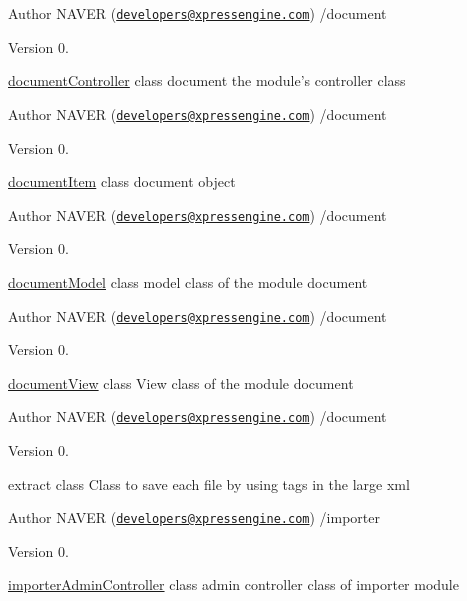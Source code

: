 \begin{DoxyAuthor}{Author}
N\-A\-V\-E\-R (\href{mailto:developers@xpressengine.com}{\tt developers@xpressengine.\-com}) /document 
\end{DoxyAuthor}
\begin{DoxyVersion}{Version}
0.
\end{DoxyVersion}
\hyperlink{classdocumentController}{document\-Controller} class document the module's controller class

\begin{DoxyAuthor}{Author}
N\-A\-V\-E\-R (\href{mailto:developers@xpressengine.com}{\tt developers@xpressengine.\-com}) /document 
\end{DoxyAuthor}
\begin{DoxyVersion}{Version}
0.
\end{DoxyVersion}
\hyperlink{classdocumentItem}{document\-Item} class document object

\begin{DoxyAuthor}{Author}
N\-A\-V\-E\-R (\href{mailto:developers@xpressengine.com}{\tt developers@xpressengine.\-com}) /document 
\end{DoxyAuthor}
\begin{DoxyVersion}{Version}
0.
\end{DoxyVersion}
\hyperlink{classdocumentModel}{document\-Model} class model class of the module document

\begin{DoxyAuthor}{Author}
N\-A\-V\-E\-R (\href{mailto:developers@xpressengine.com}{\tt developers@xpressengine.\-com}) /document 
\end{DoxyAuthor}
\begin{DoxyVersion}{Version}
0.
\end{DoxyVersion}
\hyperlink{classdocumentView}{document\-View} class View class of the module document

\begin{DoxyAuthor}{Author}
N\-A\-V\-E\-R (\href{mailto:developers@xpressengine.com}{\tt developers@xpressengine.\-com}) /document 
\end{DoxyAuthor}
\begin{DoxyVersion}{Version}
0.
\end{DoxyVersion}
extract class Class to save each file by using tags in the large xml

\begin{DoxyAuthor}{Author}
N\-A\-V\-E\-R (\href{mailto:developers@xpressengine.com}{\tt developers@xpressengine.\-com}) /importer 
\end{DoxyAuthor}
\begin{DoxyVersion}{Version}
0.
\end{DoxyVersion}
\hyperlink{classimporterAdminController}{importer\-Admin\-Controller} class admin controller class of importer module

